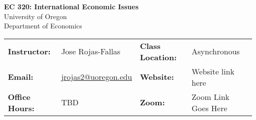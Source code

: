 \begin{center}
\textbf{\huge EC 320: International Economic Issues}\\ 
\vspace{0.1in}
University of Oregon\\ 
Department of Economics\\ 
\end{center}
\vspace{-.2in}
\begin{center}\begin{tabular}{llll}
\toprule
    \textbf{Instructor:} & \footnotesize{Jose Rojas-Fallas} & \textbf{Class Location:}  & {\footnotesize Asynchronous} \\ 
    \textbf{Email:} & \footnotesize{\href{mailto:jrojas2@uoregon.edu}{jrojas2@uoregon.edu}} & 
    \textbf{Website:} & \footnotesize{Website link here} \\
    \textbf{Office Hours:} & \footnotesize{TBD} & 
    \textbf{Zoom:} & \footnotesize{Zoom Link Goes Here} \\
\bottomrule
\end{tabular}
\end{center}